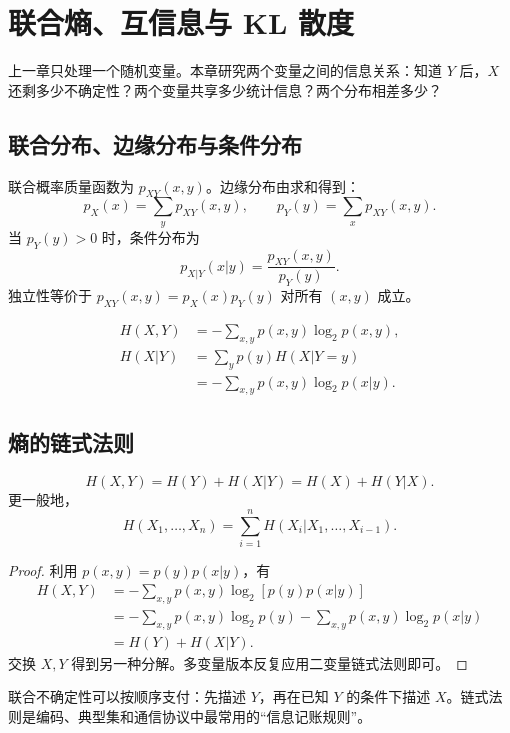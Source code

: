 \chapter{联合熵、互信息与 KL 散度}

上一章只处理一个随机变量。本章研究两个变量之间的信息关系：知道 $Y$ 后，$X$ 还剩多少不确定性？两个变量共享多少统计信息？两个分布相差多少？

\section{联合分布、边缘分布与条件分布}

联合概率质量函数为 $p_{XY}(x,y)$。边缘分布由求和得到：
\[
p_X(x)=\sum_y p_{XY}(x,y),
\qquad
p_Y(y)=\sum_x p_{XY}(x,y).
\]
当 $p_Y(y)>0$ 时，条件分布为
\[
p_{X|Y}(x|y)=\frac{p_{XY}(x,y)}{p_Y(y)}.
\]
独立性等价于 $p_{XY}(x,y)=p_X(x)p_Y(y)$ 对所有 $(x,y)$ 成立。

\begin{definition}[联合熵与条件熵]
\begin{align*}
H(X,Y)&=-\sum_{x,y}p(x,y)\log_2p(x,y),\\
H(X|Y)&=\sum_y p(y)H(X|Y=y)\\
&=-\sum_{x,y}p(x,y)\log_2p(x|y).
\end{align*}
\end{definition}

\section{熵的链式法则}

\begin{theorem}[链式法则]
\[
H(X,Y)=H(Y)+H(X|Y)=H(X)+H(Y|X).
\]
更一般地，
\[
H(X_1,\dots,X_n)=\sum_{i=1}^n H(X_i|X_1,\dots,X_{i-1}).
\]
\end{theorem}

\begin{proof}
利用 $p(x,y)=p(y)p(x|y)$，有
\begin{align*}
H(X,Y)
&=-\sum_{x,y}p(x,y)\log_2[p(y)p(x|y)]\\
&=-\sum_{x,y}p(x,y)\log_2p(y)
  -\sum_{x,y}p(x,y)\log_2p(x|y)\\
&=H(Y)+H(X|Y).
\end{align*}
交换 $X,Y$ 得到另一种分解。多变量版本反复应用二变量链式法则即可。
\end{proof}

\begin{intuitionbox}
联合不确定性可以按顺序支付：先描述 $Y$，再在已知 $Y$ 的条件下描述 $X$。链式法则是编码、典型集和通信协议中最常用的“信息记账规则”。
\end{intuitionbox}


